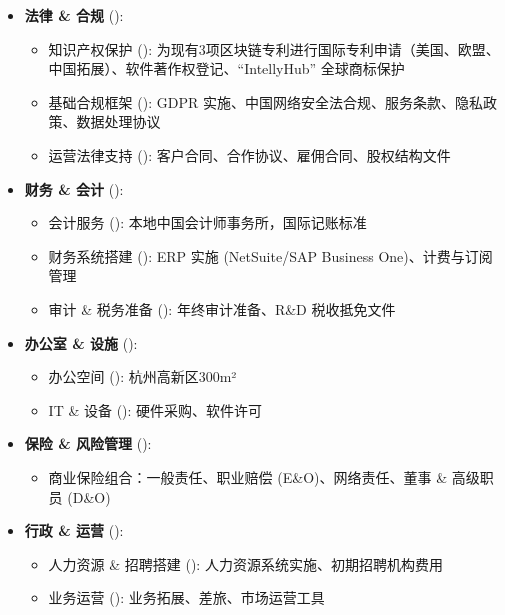 \documentclass[11pt, a4paper, oneside]{article}
\begin{document}
\begin{itemize}
    \item \textbf{法律 \& 合规} ():
    \begin{itemize}
        \item 知识产权保护 (): 为现有3项区块链专利进行国际专利申请（美国、欧盟、中国拓展）、软件著作权登记、``IntellyHub'' 全球商标保护
        \item 基础合规框架 (): GDPR 实施、中国网络安全法合规、服务条款、隐私政策、数据处理协议
        \item 运营法律支持 (): 客户合同、合作协议、雇佣合同、股权结构文件
    \end{itemize}
    
    \item \textbf{财务 \& 会计} ():
    \begin{itemize}
        \item 会计服务 (): 本地中国会计师事务所，国际记账标准
        \item 财务系统搭建 (): ERP 实施 (NetSuite/SAP Business One)、计费与订阅管理
        \item 审计 \& 税务准备 (): 年终审计准备、R\&D 税收抵免文件
    \end{itemize}
    
    \item \textbf{办公室 \& 设施} ():
    \begin{itemize}
        \item 办公空间 (): 杭州高新区300m²
        \item IT \& 设备 (): 硬件采购、软件许可
    \end{itemize}
    
    \item \textbf{保险 \& 风险管理} ():
    \begin{itemize}
        \item 商业保险组合：一般责任、职业赔偿 (E\&O)、网络责任、董事 \& 高级职员 (D\&O)
    \end{itemize}
    
    \item \textbf{行政 \& 运营} ():
    \begin{itemize}
        \item 人力资源 \& 招聘搭建 (): 人力资源系统实施、初期招聘机构费用
        \item 业务运营 (): 业务拓展、差旅、市场运营工具
    \end{itemize}
\end{itemize}
\end{document}
